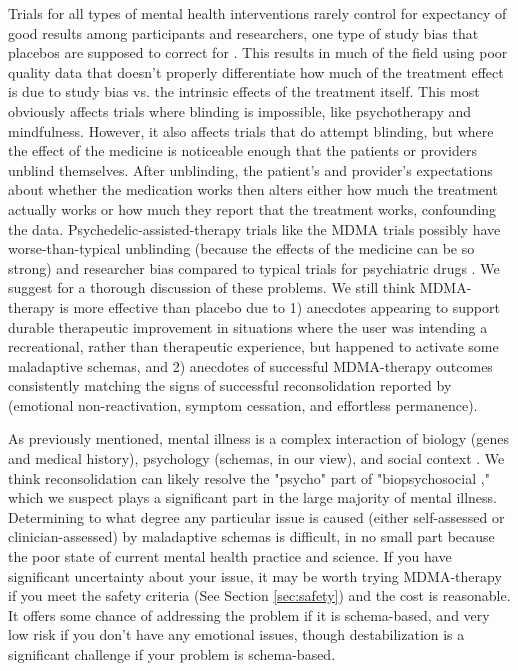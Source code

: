 \documentclass[12pt,letterpaper]{book}
\begin{document}
Trials for all types of mental health interventions rarely control for expectancy of good results among participants and researchers, one type of study bias that placebos are supposed to correct for \cite{hunekeExpectancy}. This results in much of the field using poor quality data that doesn't properly differentiate how much of the treatment effect is due to study bias vs. the intrinsic effects of the treatment itself. This most obviously affects trials where blinding is impossible, like psychotherapy and mindfulness. However, it also affects trials that do attempt blinding, but where the effect of the medicine is noticeable enough that the patients or providers unblind themselves. After unblinding, the patient's and provider's expectations about whether the medication works then alters either how much the treatment actually works or how much they report that the treatment works, confounding the data. Psychedelic-assisted-therapy trials like the MDMA trials possibly have worse-than-typical unblinding (because the effects of the medicine can be so strong) and researcher bias compared to typical trials for psychiatric drugs \cite{adayMethodologicalRigor}. We suggest \textcite{vanElkMethodology} for a thorough discussion of these problems. We still think MDMA-therapy is more effective than placebo due to 1) anecdotes appearing to support durable therapeutic improvement in situations where the user was intending a recreational, rather than therapeutic experience, but happened to activate some maladaptive schemas, and 2) anecdotes of successful MDMA-therapy outcomes consistently matching the signs of successful reconsolidation reported by \textcite{eckerUnlocking} (emotional non-reactivation, symptom cessation, and effortless permanence).

As previously mentioned, mental illness is a complex interaction of biology (genes and medical history), psychology (schemas, in our view), and social context \cite{engel1977need}. We think reconsolidation can likely resolve the "psycho" part of "biopsychosocial \cite{carhart2019rebus,eckerUnlocking}," which we suspect plays a significant part in the large majority of mental illness. Determining to what degree any particular issue is caused (either self-assessed or clinician-assessed) by maladaptive schemas is difficult, in no small part because the poor state of current mental health practice and science. If you have significant uncertainty about your issue, it may be worth trying MDMA-therapy if you meet the safety criteria (See Section \ref{sec:safety}) and the cost is reasonable. It offers some chance of addressing the problem if it is schema-based, and very low risk if you don't have any emotional issues, though destabilization is a significant challenge if your problem is schema-based.
\label{psychogenic}
\end{document}
